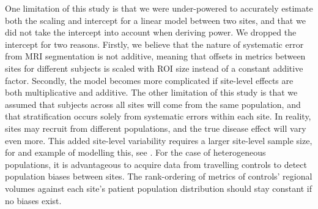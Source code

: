 One limitation of this study is that we were under-powered to accurately estimate both the scaling and intercept for a linear model between two sites, and that we did not take the intercept into account when deriving power. We dropped the intercept for two reasons. Firstly, we believe that the nature of systematic error from MRI segmentation is not additive, meaning that offsets in metrics between sites for different subjects is scaled with ROI size instead of a constant additive factor. Secondly, the model becomes more complicated if site-level effects are both multiplicative and additive. The other limitation of this study is that we assumed that subjects across all sites will come from the same population, and that stratification occurs solely from systematic errors within each site. In reality, sites may recruit from different populations, and the true disease effect will vary even more. This added site-level variability requires a larger site-level sample size, for and example of modelling this, see \cite{enigmarandom}. For the case of heterogeneous populations, it is advantageous to acquire data from travelling controls to detect population biases between sites. The rank-ordering of metrics of controls' regional volumes against each site's patient population distribution should stay constant if no biases exist.